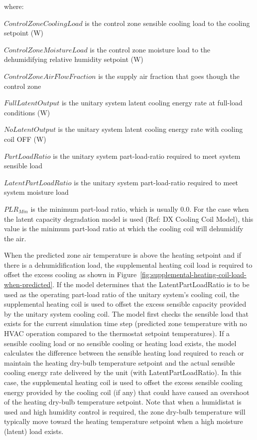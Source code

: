 where:

\(ControlZoneCoolingLoad\) is the control zone sensible cooling load to the cooling setpoint (W)

\(ControlZoneMoistureLoad\) is the control zone moisture load to the dehumidifying relative humidity setpoint (W)

\(ControlZoneAirFlowFraction\) is the supply air fraction that goes though the control zone

\(FullLatentOutput\) is the unitary system latent cooling energy rate at full-load conditions (W)

\(NoLatentOutput\) is the unitary system latent cooling energy rate with cooling coil OFF (W)

\(PartLoadRatio\) is the unitary system part-load-ratio required to meet system sensible load

\(LatentPartLoadRatio\) is the unitary system part-load-ratio required to meet system moisture load

\(PL{R_{Min}}\) is the minimum part-load ratio, which is usually 0.0. For the case when the latent capacity degradation model is used (Ref: DX Cooling Coil Model), this value is the minimum part-load ratio at which the cooling coil will dehumidify the air.

When the predicted zone air temperature is above the heating setpoint and if there is a dehumidification load, the supplemental heating coil load is required to offset the excess cooling as shown in Figure~\ref{fig:supplemental-heating-coil-load-when-predicted}. If the model determines that the LatentPartLoadRatio is to be used as the operating part-load ratio of the unitary system's cooling coil, the supplemental heating coil is used to offset the excess sensible capacity provided by the unitary system cooling coil. The model first checks the sensible load that exists for the current simulation time step (predicted zone temperature with no HVAC operation compared to the thermostat setpoint temperatures). If a sensible cooling load or no sensible cooling or heating load exists, the model calculates the difference between the sensible heating load required to reach or maintain the heating dry-bulb temperature setpoint and the actual sensible cooling energy rate delivered by the unit (with LatentPartLoadRatio). In this case, the supplemental heating coil is used to offset the excess sensible cooling energy provided by the cooling coil (if any) that could have caused an overshoot of the heating dry-bulb temperature setpoint. Note that when a humidistat is used and high humidity control is required, the zone dry-bulb temperature will typically move toward the heating temperature setpoint when a high moisture (latent) load exists.

